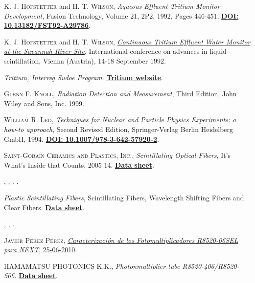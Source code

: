\begin{thebibliography}{100}
 \textsc{K. J. Hofstetter} and \textsc{H. T. Wilson},
\textit{Aqueous Effluent Tritium Monitor Development}, Fusion Technology, Volume 21, 2P2, 1992, Pages 446-451, \href{https://doi.org/10.13182/FST92-A29786}{\textbf{DOI: 10.13182/FST92-A29786}}.

 \textsc{K. J. Hofstetter} and \textsc{H. T. Wilson},
\href{https://www.osti.gov/biblio/6865647-continuous-tritium-effluent-water-monitor-savannah-river-site}{\textit{Continuous Tritium Effluent Water Monitor at the Savannah River Site}}, International conference on advances in liquid scintillation, Vienna (Austria), 14-18 September 1992.

 \textit{Tritium, Interreg Sudoe Program}. 
\href{https://tritium-sudoe.eu/es-es/homepage}{\textbf{Tritium website}}.

 \textsc{Glenn F. Knoll}, 
\textit{Radiation Detection and Measurement}, Third Edition, John Wiley and Sons, Inc. 1999.

 \textsc{William R. Leo},
\textit{Techniques for Nuclear and Particle Physics Experiments: a how-to approach}, Second Revised Edition, Springer-Verlag Berlin Heidelberg GmbH, 1994. \href{https://doi.org/10.1007/978-3-642-57920-2}{\textbf{DOI: 10.1007/978-3-642-57920-2}}. 

 \textsc{Saint-Gobain Ceramics and Plastics, Inc.},
\textit{Scintillating Optical Fibers}, It's What's Inside that Counts, 2005-14. \href{https://www.crystals.saint-gobain.com/products/scintillating-fiber}{\textbf{Data sheet}}. 

 \textsc{},
\textit{}, . \href{}{\textbf{}}. 

\textit{Plastic Scintillating Fibers}, Scintillating Fibers, Wavelength Shifting Fibers and Clear Fibers. \href{https://www.kuraray.com/products/psf}{\textbf{Data sheet}}. 

 \textsc{},
\textit{}, \href{}{\textbf{}}. 

 \textsc{Javier Pérez Pérez},
 \href{https://next.ific.uv.es/cgi-bin/DocDB/public/ShowDocument?docid=48}{\textit{Caracterización de los Fotomultiplicadores R8520-06SEL para NEXT}, 25-06-2010}.

 \textsc{HAMAMATSU PHOTONICS K.K.},
\textit{Photonmultiplier tube R8520-406/R8520-506}. \href{https://www.hamamatsu.com/eu/en/product/type/R8520-406/index.html}{\textbf{Data sheet}}.


\end{thebibliography}
